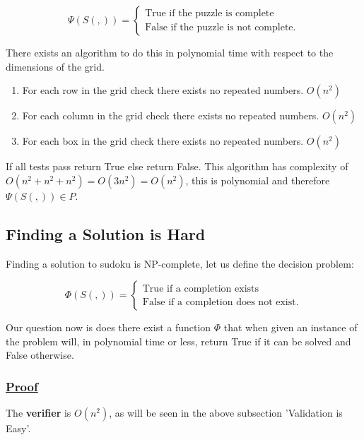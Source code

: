 \documentclass[a4paper,12pt]{article}
\begin{document}
		\begin{equation}
			\Psi(S(,)) = \begin{cases}	
				\text{True if the puzzle is complete} \\
				\text{False if the puzzle is not complete}.
			\end{cases}
		\end{equation}

There exists an algorithm to do this in polynomial time with respect to the dimensions of the grid. 
\begin{enumerate}
\item For each row in the grid check there exists no repeated numbers. $O(n^2)$
\item For each column in the grid check there exists no repeated numbers. $O(n^2)$
\item For each box in the grid check there exists no repeated numbers. $O(n^2)$
\end{enumerate}
If all tests pass return True else return False.
This algorithm has complexity of $O(n^2 + n^2 + n^2) = O(3n^2) = O(n^2)$, this is polynomial and therefore $\Psi(S(,)) \in P$.




	\subsection{Finding a Solution is Hard}
		
Finding a solution to sudoku is NP-complete, let us define the decision problem:

		\begin{equation}
		        \Phi (S(,)) = \begin{cases}
		            \text{True if a completion exists} \\
		            \text{False if a completion does not exist}.
				\end{cases}
		\end{equation}

Our question now is does there exist a function $\Phi$ that when given an instance of the problem will, in polynomial time or less, return True if it can be solved and False otherwise.

\subsubsection{\textbf{\underline{Proof}}}

The \textbf{verifier} is $O(n^2)$, as will be seen in the above subsection 'Validation is Easy'.
\end{document}
